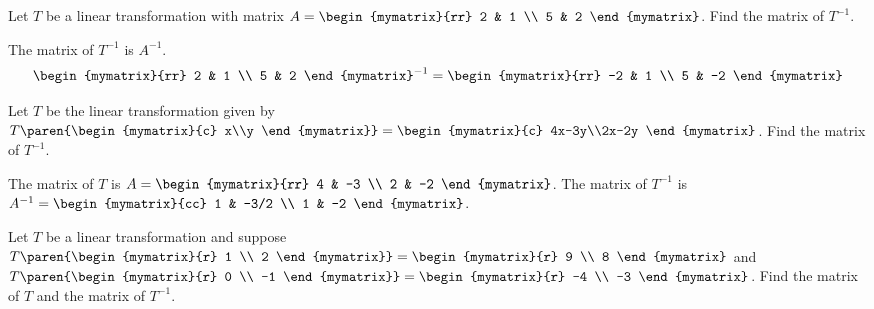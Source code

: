 \begin{ex}
  Let $T$ be a linear transformation with matrix
  $A = \begin{mymatrix}{rr}
    2 & 1 \\
    5 & 2
  \end{mymatrix}$. Find the matrix of $T^{-1}$.
  \begin{sol}
    The matrix of $T^{-1}$ is $A^{-1}$.
    \begin{equation*}
      \begin{mymatrix}{rr}
        2 & 1 \\
        5 & 2
      \end{mymatrix}^{-1} =
      \begin{mymatrix}{rr}
        -2 & 1 \\
        5 & -2
      \end{mymatrix}
    \end{equation*}
  \end{sol}
\end{ex}

\begin{ex}
  Let $T$ be the linear transformation given by
  $T\paren{\begin{mymatrix}{c} x\\y \end{mymatrix}} =
  \begin{mymatrix}{c} 4x-3y\\2x-2y \end{mymatrix}$.  Find the matrix
  of $T^{-1}$.
  \begin{sol}
    The matrix of $T$ is
    $A = \begin{mymatrix}{rr}
    4 & -3 \\
    2 & -2
  \end{mymatrix}$. The matrix of $T^{-1}$ is $A^{-1} =
  \begin{mymatrix}{cc}
    1 & -3/2 \\
    1 & -2
  \end{mymatrix}$.
  \end{sol}
\end{ex}

\begin{ex} Let $T$ be a linear transformation and suppose $T \paren{\begin{mymatrix}{r}
      1 \\
      2
    \end{mymatrix}} = \begin{mymatrix}{r}
    9 \\
    8
  \end{mymatrix}$ and $T \paren{\begin{mymatrix}{r}
      0 \\
      -1
    \end{mymatrix}} = \begin{mymatrix}{r}
    -4 \\
    -3
  \end{mymatrix}$.
  Find the matrix of $T$ and the matrix of $T^{-1}$.
\end{ex}

